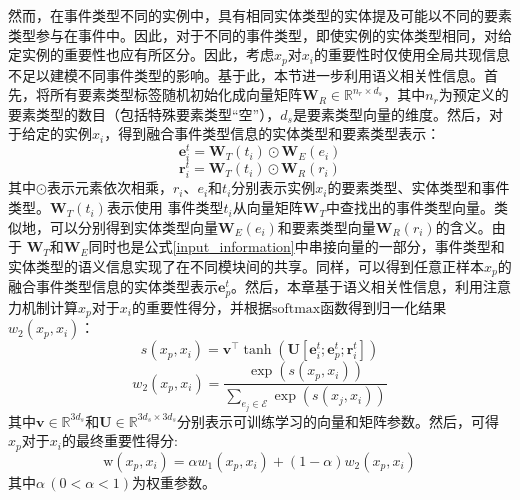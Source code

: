 然而，在事件类型不同的实例中，具有相同实体类型的实体提及可能以不同的要素类型参与在事件中。因此，对于不同的事件类型，即使实例的实体类型相同，对给定实例的重要性也应有所区分。因此，考虑$x_{p}$对$x_{i}$的重要性时仅使用全局共现信息不足以建模不同事件类型的影响。基于此，本节进一步利用语义相关性信息。首先，将所有要素类型标签随机初始化成向量矩阵$\boldsymbol{W}_{R} \in {\mathbb{R}}^{n_{r} \times d_{s}}$，其中$n_{r}$为预定义的要素类型的数目（包括特殊要素类型“空”），$d_s$是要素类型向量的维度。然后，对于给定的实例$x_{i}$，得到融合事件类型信息的实体类型和要素类型表示：
\begin{equation}
 \boldsymbol{e}_{i}^{t} = \boldsymbol{W}_{T}\left(t_{i}\right) \odot \boldsymbol{W}_{E}\left(e_{i}\right)
 \label{eq9}
\end{equation}
\begin{equation}
 \boldsymbol{r}_{i}^{t} = \boldsymbol{W}_{T}\left(t_{i}\right) \odot \boldsymbol{W}_{R}\left(r_{i}\right)
 \label{eq11}
\end{equation}
其中$\odot$表示元素依次相乘，$r_{i}$、$e_{i}$和$t_{i}$分别表示实例$x_{i}$的要素类型、实体类型和事件类型。$\boldsymbol{W}_{T}\left(t_{i}\right)$表示使用
事件类型$t_{i}$从向量矩阵$\boldsymbol{W}_{T}$中查找出的事件类型向量。类似地，可以分别得到实体类型向量$\boldsymbol{W}_{E}\left(e_{i}\right)$和要素类型向量$\boldsymbol{W}_{R}\left(r_{i}\right)$的含义。由于
$\boldsymbol{W}_{T}$和$\boldsymbol{W}_{E}$同时也是公式\ref{input_information}中串接向量的一部分，事件类型和实体类型的语义信息实现了在不同模块间的共享。同样，可以得到任意正样本$x_{p}$的融合事件类型信息的实体类型表示$\boldsymbol{e}_{p}^{t}$。然后，本章基于语义相关性信息，利用注意力机制计算$x_{p}$对于$x_{i}$的重要性得分，并根据$\textrm{softmax}$函数得到归一化结果$w_{2}\left(x_{p}, x_{i}\right)$：
\begin{equation}
s\left(x_{p},x_{i}\right)=\boldsymbol{v}^{\top} \tanh \left(\boldsymbol{U}\left[\boldsymbol{e}_{i}^{t};\boldsymbol{e}_{p}^{t};\boldsymbol{r}_{i}^{t}\right]\right)
\end{equation}
\begin{equation}
 w_{2}\left(x_{p}, x_{i}\right) =  \frac{\exp \left(s\left(x_{p},x_{i}\right)\right)}{\sum_{e_{j} \in \mathcal{E}}\exp \left(s\left(x_{j},x_{i}\right)\right)}
\end{equation}
其中$\boldsymbol{v} \in {\mathbb{R}}^{3d_{s}}$和$\boldsymbol{U} \in {\mathbb{R}}^{3d_{s} \times 3d_{s}}$分别表示可训练学习的向量和矩阵参数。然后，可得$x_{p}$对于$x_{i}$的最终重要性得分:
\begin{equation}
 {\textrm{w}}\left(x_{p}, x_{i}\right) = \alpha w_{1}\left(x_{p}, x_{i}\right) + (1-\alpha) w_{2}\left(x_{p}, x_{i}\right)
\end{equation}
其中$\alpha\,(0 < \alpha < 1)$为权重参数。

